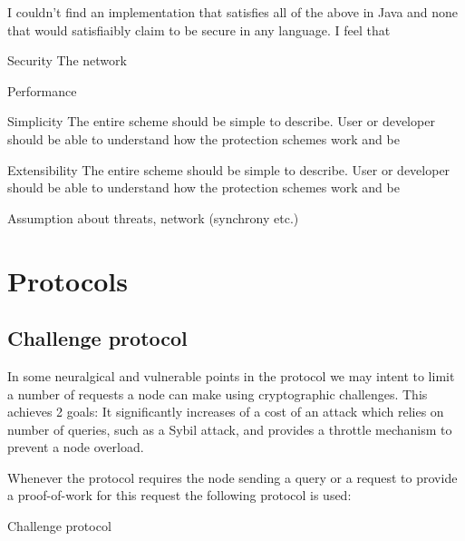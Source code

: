 I couldn't find an implementation that satisfies all of the above in Java and
none that would satisfiaibly claim to be secure in any language. I feel that 

\begin{description}
  \item{Security} The network 
  \item{Performance} 
  \item{Simplicity} The entire scheme should be simple to
    describe. User or developer should be able to understand how the protection
    schemes work and be
  \item{Extensibility} The entire scheme should be simple to
    describe. User or developer should be able to understand how the protection
    schemes work and be
\end{description}

Assumption about threats, network (synchrony etc.)

\section{Protocols}
\subsection{Challenge protocol}
In some neuralgical and vulnerable points in the protocol we may intent to limit
a number of requests a node can make using cryptographic challenges. This
achieves 2 goals: It significantly increases of a cost of an attack which relies
on number of queries, such as a Sybil attack, and provides a throttle mechanism
to prevent a node overload.

Whenever the protocol requires the node sending a query or a request to provide
a proof-of-work for this request the following protocol is used:


\begin{msc}{Challenge protocol}
\setlength{\instdist}{9cm}
\setlength{\envinstdist}{3cm}
\nextlevel
{}
\nextlevel[9]
\nextlevel[1]
\nextlevel[4]
\nextlevel
{}
\nextlevel[4]
\end{msc}

